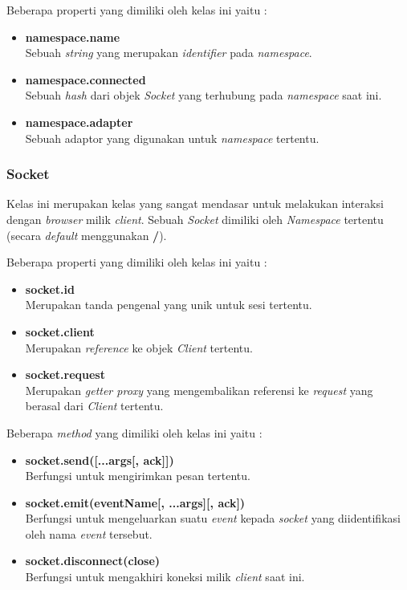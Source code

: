 Beberapa properti yang dimiliki oleh kelas ini yaitu : 
\begin{itemize}
	\item \textbf{namespace.name} \\ Sebuah \textit{string} yang merupakan \textit{identifier} pada \textit{namespace}.
	\item \textbf{namespace.connected} \\ Sebuah \textit{hash} dari objek \textit{Socket} yang terhubung pada \textit{namespace} saat ini.
	\item \textbf{namespace.adapter} \\ Sebuah adaptor yang digunakan untuk \textit{namespace} tertentu.
\end{itemize}

\subsubsection{Socket}
Kelas ini merupakan kelas yang sangat mendasar untuk melakukan interaksi dengan \textit{browser} milik \textit{client}. Sebuah \textit{Socket} dimiliki oleh \textit{Namespace} tertentu (secara \textit{default} menggunakan \textbf{/}).

Beberapa properti yang dimiliki oleh kelas ini yaitu : 
\begin{itemize}
	\item \textbf{socket.id} \\ Merupakan tanda pengenal yang unik untuk sesi tertentu.
	\item \textbf{socket.client} \\ Merupakan \textit{reference} ke objek \textit{Client} tertentu.
	\item \textbf{socket.request} \\ Merupakan \textit{getter proxy} yang mengembalikan referensi ke \textit{request} yang berasal dari \textit{Client} tertentu.
\end{itemize}

Beberapa \textit{method} yang dimiliki oleh kelas ini yaitu : 
\begin{itemize}
	\item \textbf{socket.send([...args[, ack]])} \\ Berfungsi untuk mengirimkan pesan tertentu.
	\item \textbf{socket.emit(eventName[, ...args][, ack])} \\ Berfungsi untuk mengeluarkan suatu \textit{event} kepada \textit{socket} yang diidentifikasi oleh nama \textit{event} tersebut.
	\item \textbf{socket.disconnect(close)} \\ Berfungsi untuk mengakhiri koneksi milik \textit{client} saat ini.
\end{itemize}

